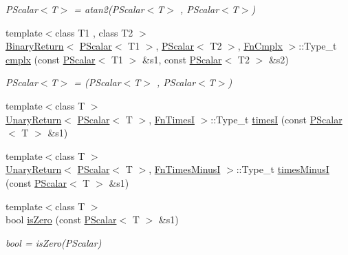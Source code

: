 \begin{DoxyCompactItemize}
\begin{DoxyCompactList}\small\item\em P\+Scalar$<$\+T$>$ = atan2(\+P\+Scalar$<$\+T$>$ , P\+Scalar$<$\+T$>$) \end{DoxyCompactList}\item 
{\footnotesize template$<$class T1 , class T2 $>$ }\\\mbox{\hyperlink{structENSEM_1_1BinaryReturn}{Binary\+Return}}$<$ \mbox{\hyperlink{classENSEM_1_1PScalar}{P\+Scalar}}$<$ T1 $>$, \mbox{\hyperlink{classENSEM_1_1PScalar}{P\+Scalar}}$<$ T2 $>$, \mbox{\hyperlink{structENSEM_1_1FnCmplx}{Fn\+Cmplx}} $>$\+::Type\+\_\+t \mbox{\hyperlink{group__primscalar_ga72cf1623c0ae655c15db12ad096194dc}{cmplx}} (const \mbox{\hyperlink{classENSEM_1_1PScalar}{P\+Scalar}}$<$ T1 $>$ \&s1, const \mbox{\hyperlink{classENSEM_1_1PScalar}{P\+Scalar}}$<$ T2 $>$ \&s2)
\begin{DoxyCompactList}\small\item\em P\+Scalar$<$\+T$>$ = (P\+Scalar$<$\+T$>$ , P\+Scalar$<$\+T$>$) \end{DoxyCompactList}\item 
{\footnotesize template$<$class T $>$ }\\\mbox{\hyperlink{structENSEM_1_1UnaryReturn}{Unary\+Return}}$<$ \mbox{\hyperlink{classENSEM_1_1PScalar}{P\+Scalar}}$<$ T $>$, \mbox{\hyperlink{structENSEM_1_1FnTimesI}{Fn\+TimesI}} $>$\+::Type\+\_\+t \mbox{\hyperlink{group__primscalar_ga70f6abe538ba4ee394447d572f919fc0}{timesI}} (const \mbox{\hyperlink{classENSEM_1_1PScalar}{P\+Scalar}}$<$ T $>$ \&s1)
\item 
{\footnotesize template$<$class T $>$ }\\\mbox{\hyperlink{structENSEM_1_1UnaryReturn}{Unary\+Return}}$<$ \mbox{\hyperlink{classENSEM_1_1PScalar}{P\+Scalar}}$<$ T $>$, \mbox{\hyperlink{structENSEM_1_1FnTimesMinusI}{Fn\+Times\+MinusI}} $>$\+::Type\+\_\+t \mbox{\hyperlink{group__primscalar_gabd11ad8f843bcbe3cfbf91ad061f864a}{times\+MinusI}} (const \mbox{\hyperlink{classENSEM_1_1PScalar}{P\+Scalar}}$<$ T $>$ \&s1)
\item 
{\footnotesize template$<$class T $>$ }\\bool \mbox{\hyperlink{group__primscalar_gab10f703e7498f1638c401a92ca8bc947}{is\+Zero}} (const \mbox{\hyperlink{classENSEM_1_1PScalar}{P\+Scalar}}$<$ T $>$ \&s1)
\begin{DoxyCompactList}\small\item\em bool = is\+Zero(\+P\+Scalar) \end{DoxyCompactList}\item 

\end{DoxyCompactItemize}
